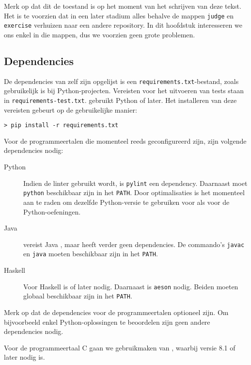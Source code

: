 \inputminted{text}{code/dirs-tested.txt}

Merk op dat dit de toestand is op het moment van het schrijven van deze tekst.
Het is te voorzien dat in een later stadium alles behalve de mappen \texttt{judge} en \texttt{exercise} verhuizen naar een andere repository.
In dit hoofdstuk interesseren we ons enkel in die mappen, dus we voorzien geen grote problemen.

\subsection{Dependencies}\label{subsec:dependencies}

De dependencies van \tested{} zelf zijn opgelijst is een \texttt{requirements.txt}-bestand, zoals gebruikelijk is bij Python-projecten.
Vereisten voor het uitvoeren van tests staan in \texttt{requirements-test.txt}.
\tested{} gebruikt Python  of later.
Het installeren van deze vereisten gebeurt op de gebruikelijke manier:

\begin{verbatim}
> pip install -r requirements.txt
\end{verbatim}

Voor de programmeertalen die momenteel reeds geconfigureerd zijn, zijn volgende dependencies nodig:

\begin{description}
    \item[Python] Indien de linter gebruikt wordt, is \texttt{pylint} een dependency.
    Daarnaast moet \texttt{python} beschikbaar zijn in het \texttt{PATH}.
    Door optimalisaties is het momenteel aan te raden om dezelfde Python-versie te gebruiken voor \tested{} als voor de Python-oefeningen.
    \item[Java] \tested{} vereist Java , maar heeft verder geen dependencies.
    De commando's \texttt{javac} en \texttt{java} moeten beschikbaar zijn in het \texttt{PATH}.
    \item[Haskell] Voor Haskell is   of later nodig.
    Daarnaast is \texttt{aeson} nodig.
    Beiden moeten globaal beschikbaar zijn in het \texttt{PATH}.
\end{description}

Merk op dat de dependencies voor de programmeertalen optioneel zijn.
Om bijvoorbeeld enkel Python-oplossingen te beoordelen zijn geen andere dependencies nodig.

Voor de programmeertaal C gaan we gebruikmaken van , waarbij versie 8.1 of later nodig is.


